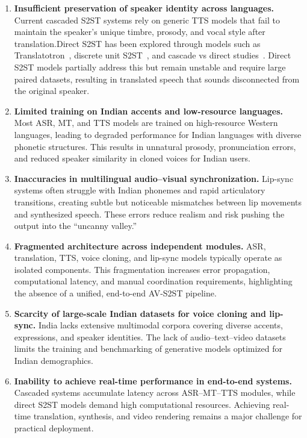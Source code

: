 \documentclass[12pt,oneside]{report}
\begin{document}
\begin{enumerate}
    \item \textbf{Insufficient preservation of speaker identity across languages.}  
    Current cascaded S2ST systems rely on generic TTS models that fail to maintain the speaker’s unique timbre, prosody, and vocal style after translation.Direct S2ST has been explored through models such as Translatotron~\cite{jia2019translatotron}, discrete unit S2ST~\cite{lee2022discrete_s2st}, and cascade vs direct studies~\cite{freitag2022cascade}. Direct S2ST models partially address this but remain unstable and require large paired datasets, resulting in translated speech that sounds disconnected from the original speaker.

    \item \textbf{Limited training on Indian accents and low-resource languages.}  
    Most ASR, MT, and TTS models are trained on high-resource Western languages, leading to degraded performance for Indian languages with diverse phonetic structures. This results in unnatural prosody, pronunciation errors, and reduced speaker similarity in cloned voices for Indian users.

    \item \textbf{Inaccuracies in multilingual audio--visual synchronization.}  
    Lip-sync systems often struggle with Indian phonemes and rapid articulatory transitions, creating subtle but noticeable mismatches between lip movements and synthesized speech. These errors reduce realism and risk pushing the output into the ``uncanny valley.''

    \item \textbf{Fragmented architecture across independent modules.}  
    ASR, translation, TTS, voice cloning, and lip-sync models typically operate as isolated components. This fragmentation increases error propagation, computational latency, and manual coordination requirements, highlighting the absence of a unified, end-to-end AV-S2ST pipeline.

    \item \textbf{Scarcity of large-scale Indian datasets for voice cloning and lip-sync.}  
    India lacks extensive multimodal corpora covering diverse accents, expressions, and speaker identities. The lack of audio--text--video datasets limits the training and benchmarking of generative models optimized for Indian demographics.

    \item \textbf{Inability to achieve real-time performance in end-to-end systems.}  
    Cascaded systems accumulate latency across ASR--MT--TTS modules, while direct S2ST models demand high computational resources. Achieving real-time translation, synthesis, and video rendering remains a major challenge for practical deployment.


\end{enumerate}
\end{document}
